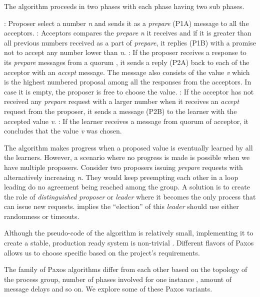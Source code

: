 The algorithm proceeds in two phases with each phase having two sub phases.

\begin{itemize}
  : Proposer select a number \emph{n} and sends it as a
  \emph{prepare} (P1A) message to all the acceptors.
  : Acceptors compares the \emph{prepare} \emph{n} it receives
  and if it is greater than all previous numbers received as a part of 
  \emph{prepare}, it replies (P1B) with a promise not to accept any number lower
  than \emph{n}.
  : If the proposer receives a response to its \emph{prepare}
  messages from a quorum%
  , it sends a reply (P2A) back to each of the acceptor with an \emph{accept} 
  message. The message also consists of the value \emph{v} which is the highest 
  numbered proposal among all the responses from the acceptors. In case it is 
  empty, the proposer is free to choose the value.
  : If the acceptor has not received any \emph{prepare} request
  with a larger number when it receives an \emph{accept} request from the 
  proposer, it sends a message (P2B) to the learner with the accepted value 
  \emph{v}.
  : If the learner receives a message from quorum of acceptor, it
  concludes that the value \emph{v} was chosen.
\end{itemize}

The algorithm makes progress when a proposed value is eventually learned by all
the learners. However, a scenario where no progress is made is possible when we 
have multiple proposers. Consider two proposers issuing \emph{prepare} requests
with alternatively increasing \emph{n}. They would keep preempting each other
in a loop leading do no agreement being reached among the group. A solution is
to create the role of \emph{distinguished proposer} or \emph{leader} where it
becomes the only process that can issue new requests. \citet{FisLynPat85}
implies the ``election'' of this \emph{leader} should use either randomness
or timeouts.

Although the pseudo-code of the algorithm is relatively small, implementing it
to create a stable, production ready system is non-trivial \citep{ChandraGR07}.
Different flavors of Paxos allows us to choose specific based on the project's
requirements.

The family of Paxos algorithms differ from each other based on the topology
of the process group, number of phases involved for one instance%
, amount of message delays and so on. We explore some of these Paxos variants.

